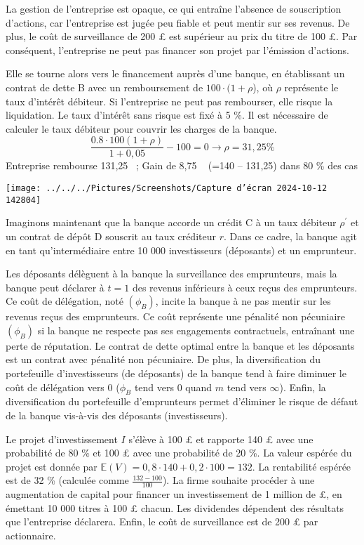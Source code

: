 \documentclass[a4paper, 12pt]{report}
\begin{document}
La gestion de l’entreprise est opaque, ce qui entraîne l'absence de souscription d’actions, car l'entreprise est jugée peu fiable et peut mentir sur ses revenus. De plus, le coût de surveillance de 200 £ est supérieur au prix du titre de 100 £. Par conséquent, l’entreprise ne peut pas financer son projet par l’émission d’actions.

Elle se tourne alors vers le financement auprès d’une banque, en établissant un contrat de dette B avec un remboursement de $100 \cdot (1 + \rho$), où $\rho$ représente le taux d’intérêt débiteur. Si l’entreprise ne peut pas rembourser, elle risque la liquidation. Le taux d’intérêt sans risque est fixé à 5 \%. Il est nécessaire de calculer le taux débiteur pour couvrir les charges de la banque.
$$
\frac{0.8\cdot100(1+\rho)}{1+0,05}-100=0\longrightarrow \rho=31,25\%
$$
Entreprise rembourse 131,25 \textsterling~; Gain de 8,75 \textsterling~ (=140 – 131,25) dans 80 \% des cas

\begin{center}
	\texttt{[image: ../../../Pictures/Screenshots/Capture d'écran 2024-10-12 142804]}
\end{center}

Imaginons maintenant que la banque accorde un crédit C à un taux débiteur $\rho^{'}$ et un contrat de dépôt D souscrit au taux créditeur $r$. Dans ce cadre, la banque agit en tant qu'intermédiaire entre 10 000 investisseurs (déposants) et un emprunteur.

Les déposants délèguent à la banque la surveillance des emprunteurs, mais la banque peut déclarer à \( t=1 \) des revenus inférieurs à ceux reçus des emprunteurs. Ce coût de délégation, noté $\left( \phi_B\right)$, incite la banque à ne pas mentir sur les revenus reçus des emprunteurs. Ce coût représente une pénalité non pécuniaire $\left( \phi_B\right)$ si la banque ne respecte pas ses engagements contractuels, entraînant une perte de réputation. Le contrat de dette optimal entre la banque et les déposants est un contrat avec pénalité non pécuniaire. De plus, la diversification du portefeuille d’investisseurs (de déposants) de la banque tend à faire diminuer le coût de délégation vers 0 ($\phi_B$ tend vers 0 quand \( m \) tend vers \( \infty \)). Enfin, la diversification du portefeuille d’emprunteurs permet d’éliminer le risque de défaut de la banque vis-à-vis des déposants (investisseurs).

Le projet d’investissement \( I \) s'élève à 100 £ et rapporte 140 £ avec une probabilité de 80 \% et 100 £ avec une probabilité de 20 \%. La valeur espérée du projet est donnée par \( \mathbb{E}(V) = 0,8 \cdot 140 + 0,2 \cdot 100 = 132 \). La rentabilité espérée est de 32 \% (calculée comme \( \frac{132 - 100}{100} \)). La firme souhaite procéder à une augmentation de capital pour financer un investissement de 1 million de £, en émettant 10 000 titres à 100 £ chacun. Les dividendes dépendent des résultats que l’entreprise déclarera. Enfin, le coût de surveillance est de 200 £ par actionnaire.
\end{document}
